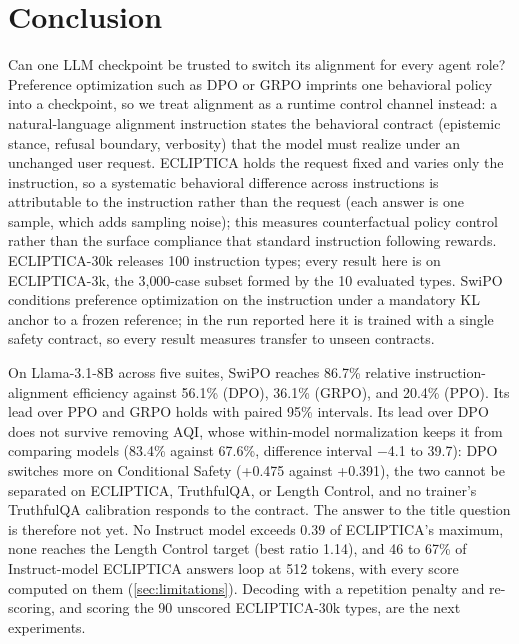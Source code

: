\documentclass[11pt]{article}
\begin{document}







\section{Conclusion}
\label{sec:conclusion}

Can one LLM checkpoint be trusted to switch its alignment for every agent role? Preference optimization such as DPO or GRPO imprints one behavioral policy into a checkpoint, so we treat alignment as a runtime control channel instead: a natural-language alignment instruction states the behavioral contract (epistemic stance, refusal boundary, verbosity) that the model must realize under an unchanged user request. ECLIPTICA holds the request fixed and varies only the instruction, so a systematic behavioral difference across instructions is attributable to the instruction rather than the request (each answer is one sample, which adds sampling noise); this measures counterfactual policy control rather than the surface compliance that standard instruction following rewards. ECLIPTICA-30k releases 100 instruction types; every result here is on ECLIPTICA-3k, the 3{,}000-case subset formed by the 10 evaluated types. SwiPO conditions preference optimization on the instruction under a mandatory KL anchor to a frozen reference; in the run reported here it is trained with a single safety contract, so every result measures transfer to unseen contracts.

On Llama-3.1-8B across five suites, SwiPO reaches 86.7\% relative instruction-alignment efficiency against 56.1\% (DPO), 36.1\% (GRPO), and 20.4\% (PPO). Its lead over PPO and GRPO holds with paired 95\% intervals. Its lead over DPO does not survive removing AQI, whose within-model normalization keeps it from comparing models (83.4\% against 67.6\%, difference interval $-$4.1 to 39.7): DPO switches more on Conditional Safety (+0.475 against +0.391), the two cannot be separated on ECLIPTICA, TruthfulQA, or Length Control, and no trainer's TruthfulQA calibration responds to the contract. The answer to the title question is therefore not yet. No Instruct model exceeds 0.39 of ECLIPTICA's maximum, none reaches the Length Control target (best ratio 1.14), and 46 to 67\% of Instruct-model ECLIPTICA answers loop at 512 tokens, with every score computed on them (\cref{sec:limitations}). Decoding with a repetition penalty and re-scoring, and scoring the 90 unscored ECLIPTICA-30k types, are the next experiments.
\end{document}
